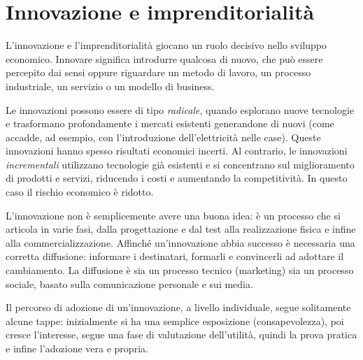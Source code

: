 

\section{Innovazione e imprenditorialità}
L’innovazione e l’imprenditorialità giocano un ruolo decisivo nello sviluppo economico.  
Innovare significa introdurre qualcosa di nuovo, che può essere percepito dai sensi oppure riguardare un metodo di lavoro, un processo industriale, un servizio o un modello di business.  

Le innovazioni possono essere di tipo \emph{radicale}, quando esplorano nuove tecnologie e trasformano profondamente i mercati esistenti generandone di nuovi (come accadde, ad esempio, con l’introduzione dell’elettricità nelle case). Queste innovazioni hanno spesso risultati economici incerti.  
Al contrario, le innovazioni \emph{incrementali} utilizzano tecnologie già esistenti e si concentrano sul miglioramento di prodotti e servizi, riducendo i costi e aumentando la competitività. In questo caso il rischio economico è ridotto.

\medskip

L’innovazione non è semplicemente avere una buona idea: è un processo che si articola in varie fasi, dalla progettazione e dal test alla realizzazione fisica e infine alla commercializzazione.  
Affinché un’innovazione abbia successo è necessaria una corretta diffusione: informare i destinatari, formarli e convincerli ad adottare il cambiamento. La diffusione è sia un processo tecnico (marketing) sia un processo sociale, basato sulla comunicazione personale e sui media.

Il percorso di adozione di un’innovazione, a livello individuale, segue solitamente alcune tappe: inizialmente si ha una semplice esposizione (consapevolezza), poi cresce l’interesse, segue una fase di valutazione dell’utilità, quindi la prova pratica e infine l’adozione vera e propria.  

